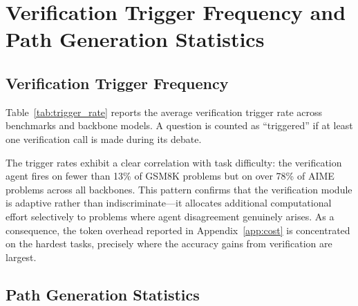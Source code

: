\section{Verification Trigger Frequency and Path Generation Statistics}
\label{app:trigger_stats}

\subsection{Verification Trigger Frequency}

Table~\ref{tab:trigger_rate} reports the average verification trigger rate across benchmarks and backbone models. A question is counted as ``triggered'' if at least one verification call is made during its debate.

\begin{table}[h]
\centering
{}
\caption{Average verification trigger rate (\%) per benchmark and backbone model. Benchmarks are ordered by increasing difficulty.}
\label{tab:trigger_rate}
\end{table}

The trigger rates exhibit a clear correlation with task difficulty: the verification agent fires on fewer than 13\% of GSM8K problems but on over 78\% of AIME problems across all backbones. This pattern confirms that the verification module is adaptive rather than indiscriminate---it allocates additional computational effort selectively to problems where agent disagreement genuinely arises. As a consequence, the token overhead reported in Appendix~\ref{app:cost} is concentrated on the hardest tasks, precisely where the accuracy gains from verification are largest.

\subsection{Path Generation Statistics}

